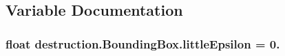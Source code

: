 \subsection{Variable Documentation}
\hypertarget{namespacedestruction_1_1_bounding_box_afe5f776614a568185f1a2b2a53f41919}{
\subsubsection[{little\-Epsilon}]{\setlength{\rightskip}{0pt plus 5cm}float destruction.\-Bounding\-Box.\-little\-Epsilon = 0.}}\label{namespacedestruction_1_1_bounding_box_afe5f776614a568185f1a2b2a53f41919}
